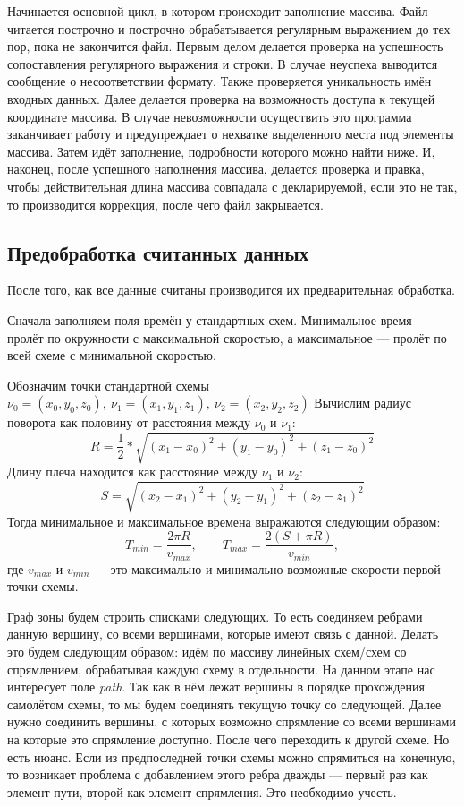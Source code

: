 \documentclass[12pt]{article}
\theoremstyle{plain}
\begin{document}
Начинается основной цикл, в котором происходит заполнение массива. Файл читается построчно и построчно обрабатывается регулярным выражением до тех пор, пока не закончится файл. Первым делом делается проверка на успешность сопоставления регулярного выражения и строки. В случае неуспеха выводится сообщение о несоответствии формату. Также проверяется уникальность имён входных данных. Далее делается проверка на возможность доступа к текущей координате массива. В случае невозможности осуществить это программа заканчивает работу и предупреждает о нехватке выделенного места под элементы массива. Затем идёт заполнение, подробности которого можно найти ниже. И, наконец, после успешного наполнения массива, делается проверка и правка, чтобы действительная длина массива совпадала с декларируемой, если это не так, то производится коррекция, после чего файл закрывается.

\subsection{Предобработка считанных данных}

После того, как все данные считаны производится их предварительная обработка.

Сначала заполняем поля времён у стандартных схем. Минимальное время --- пролёт по окружности с максимальной скоростью, а максимальное --- пролёт по всей схеме с минимальной скоростью.

Обозначим точки стандартной схемы $\nu_0 = (x_0, y_0, z_0),~ \nu_1 = (x_1, y_1, z_1),~ \nu_2 = (x_2, y_2, z_2)$
Вычислим радиус поворота как половину от расстояния между $\nu_0$ и $\nu_1$:
$$
  R = \frac{1}{2} \ast \sqrt{(x_1 - x_0)^2 + (y_1 - y_0)^2 + (z_1 - z_0)^2}
$$
Длину плеча находится как расстояние между $\nu_1$ и $\nu_2$:
$$
  S = \sqrt{(x_2 - x_1)^2 + (y_2 - y_1)^2 + (z_2 - z_1)^2}
$$
Тогда минимальное и максимальное времена выражаются следующим образом:
$$
  T_{min} = \frac{2 \pi R}{v_{max}}, \qquad 
    T_{max} = \frac{2(S + \pi R)}{v_{min}},
$$
где $v_{max}$ и $v_{min}$ --- это максимально и минимально возможные скорости первой точки схемы.

Граф зоны будем строить списками следующих. То есть соединяем ребрами данную вершину, со всеми вершинами, которые имеют связь с данной. Делать это будем следующим образом: идём по массиву линейных схем/схем со спрямлением, обрабатывая каждую схему в отдельности. На данном этапе нас интересует поле \textit{path}. Так как в нём лежат вершины в порядке прохождения самолётом схемы, то мы будем соединять текущую точку со следующей. Далее нужно соединить вершины, с которых возможно спрямление со всеми вершинами на которые это спрямление доступно. После чего переходить к другой схеме. Но есть нюанс. Если из предпоследней точки схемы можно спрямиться на конечную, то возникает проблема с добавлением этого ребра дважды --- первый раз как элемент пути, второй как элемент спрямления. Это необходимо учесть. 
\end{document}
